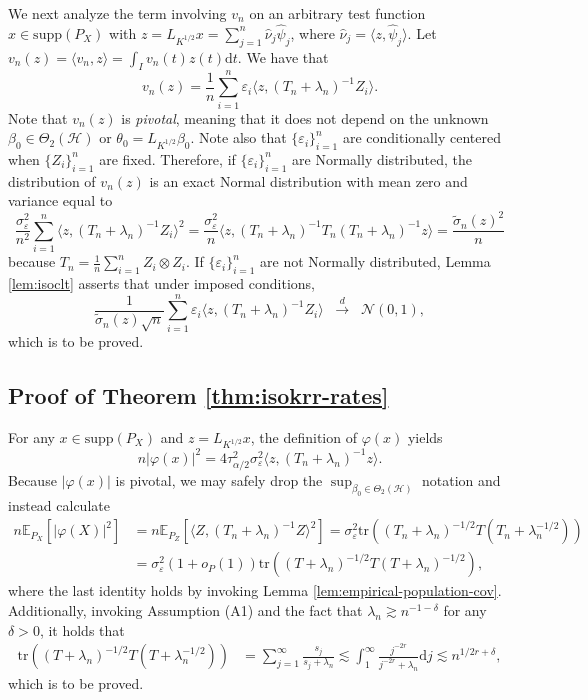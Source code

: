\documentclass[aos]{imsart}
\renewcommand{\hat}{\widehat}
\renewcommand{\tilde}{\widetilde}
\newcommand{\tr}{\mathrm{tr}}
\newcommand{\supp}{\mathrm{supp}}
\newcommand{\ud}{\mathrm d}
\newcommand{\mH}{\mathcal H}
\theoremstyle{plain}
\theoremstyle{definition}
\theoremstyle{definition}
\begin{document}
\begin{appendix}
We next analyze the term involving $v_n$ on an arbitrary test function $x\in\supp(P_X)$ with $z=L_{K^{1/2}}x=\sum_{j=1}^n\hat\nu_j\hat\psi_j$, where $\hat\nu_j=\langle z,\hat\psi_j\rangle$.
Let $v_n(z)=\langle v_n,z\rangle = \int_I v_n(t)z(t)\ud t$. We have that
$$
v_n(z) = \frac{1}{n}\sum_{i=1}^n \varepsilon_i \langle z, (T_n+\lambda_n)^{-1}Z_i\rangle.
$$
Note that $v_n(z)$ is \emph{pivotal}, meaning that it does not depend on the unknown $\beta_0\in\Theta_2(\mH)$ or $\theta_0=L_{K^{1/2}}\beta_0$.
Note also that $\{\varepsilon_i\}_{i=1}^n$ are conditionally centered when $\{Z_i\}_{i=1}^n$ are fixed. Therefore, if $\{\varepsilon_i\}_{i=1}^n$ are Normally distributed,
the distribution of $v_n(z)$ is an exact Normal distribution with mean zero and variance equal to
$$
\frac{{\sigma_\varepsilon^2}}{n^2}\sum_{i=1}^n \langle z,(T_n+\lambda_n)^{-1}Z_i\rangle^2 = \frac{{\sigma_\varepsilon^2}}{n}\langle z, (T_n+\lambda_n)^{-1}T_n(T_n+\lambda_n)^{-1}z\rangle = \frac{\tilde\sigma_n(z)^2}{n}
$$
because $T_n=\frac{1}{n}\sum_{i=1}^n Z_i\otimes Z_i$. If $\{\varepsilon_i\}_{i=1}^n$ are not Normally distributed, Lemma \ref{lem:isoclt} asserts that under imposed conditions,
$$
\frac{1}{\tilde\sigma_n(z)\sqrt{n}}\sum_{i=1}^n\varepsilon_i\langle z,(T_n+\lambda_n)^{-1}Z_i\rangle\;\;\overset{d}{\to}\;\; \mathcal N(0,1),
$$
which is to be proved.

\subsection{Proof of Theorem \ref{thm:isokrr-rates}}

For any $x\in\supp(P_X)$ and $z=L_{K^{1/2}}x$, the definition of $\varphi(x)$ yields
$$
n\big|\varphi(x)\big|^2 = 4 \tau^2_{\alpha/2}\sigma_\varepsilon^2\langle z, (T_n+\lambda_n)^{-1}z\rangle.
$$
Because $|\varphi(x)|$ is pivotal, we may safely drop the $\sup_{\beta_0\in\Theta_2(\mH)}$ notation and instead calculate
\begin{align*}
n\mathbb E_{P_X}\left[|\varphi(X)|^2\right] &= n\mathbb E_{P_Z}[\langle Z,(T_n+\lambda_n)^{-1}Z\rangle^2] = \sigma_\varepsilon^2\tr((T_n+\lambda_n)^{-1/2}T(T_n+\lambda_n^{-1/2}))\\
&= \sigma_\varepsilon^2(1+o_P(1))\tr((T+\lambda_n)^{-1/2}T(T+\lambda_n)^{-1/2}),
\end{align*}
where the last identity holds by invoking Lemma \ref{lem:empirical-population-cov}. Additionally, invoking Assumption (A1) and the fact that $\lambda_n\gtrsim n^{-1-\delta}$ for any $\delta>0$, it holds that
\begin{align*}
\tr((T+\lambda_n)^{-1/2}T(T+\lambda_n^{-1/2})) &= \sum_{j=1}^{\infty} \frac{s_j}{s_j+\lambda_n} \lesssim \int_1^{\infty}\frac{j^{-2r}}{j^{-2r}+\lambda_n}\ud j\lesssim n^{1/2r+\delta},
\end{align*}
which is to be proved.


\end{appendix}
\end{document}

